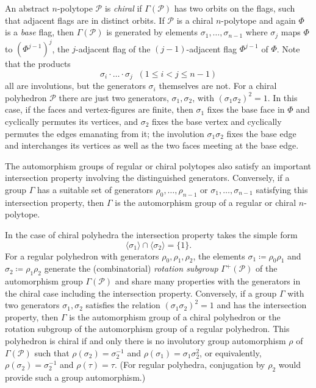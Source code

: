 \documentclass[12pt]{article}
\theoremstyle{definition}\newtheorem{definition}{Definition}[section]
\begin{document}
An abstract $n$-polytope $\mathcal{P}$ is {\em chiral\/} if $\Gamma(\mathcal{P})$ has two orbits on the flags, such that adjacent flags are in distinct orbits. If $\mathcal{P}$ is a chiral $n$-polytope and again $\Phi$ is a {\em base\/} flag, then $\Gamma(\mathcal{P})$ is generated by elements $\sigma_1,\ldots,\sigma_{n-1}$ where $\sigma_j$ maps $\Phi$ to $(\Phi^{j-1})^{j}$, the $j$-adjacent flag of the $(j-1)$-adjacent flag $\Phi^{j-1}$ of $\Phi$. Note that the products
\[\sigma_{i}\cdot\ldots\cdot\sigma_{j}\;\; (1\leq i<j\leq n-1)\]
all are involutions, but the generators $\sigma_i$ themselves are not. For a chiral polyhedron $\mathcal{P}$ there are just two generators, $\sigma_{1},\sigma_{2}$, with $(\sigma_1\sigma_2)^2=1$. In this case, if the faces and vertex-figures are finite, then $\sigma_1$ fixes the base face in $\Phi$ and cyclically permutes its vertices, and $\sigma_2$ fixes the base vertex and cyclically permutes the edges emanating from it; the involution $\sigma_1\sigma_2$ fixes the base edge and interchanges its vertices as well as the two faces meeting at the base edge.
\smallskip

The automorphism groups of regular or chiral polytopes also satisfy an important intersection property involving the distinguished generators. Conversely, if a group $\Gamma$ has a suitable set of generators $\rho_0,\ldots,\rho_{n-1}$ or $\sigma_1,\ldots,\sigma_{n-1}$ satisfying this intersection property, then $\Gamma$ is the automorphism group of a regular or chiral $n$-polytope. 

In the case of chiral polyhedra the intersection property takes the simple form 
\[\langle\sigma_1\rangle \cap \langle\sigma_2\rangle = \{1\}.\]
For a regular polyhedron with generators $\rho_0,\rho_1,\rho_2$, the elements $\sigma_1\coloneqq \rho_0\rho_1$ and $\sigma_2\coloneqq  \rho_1\rho_2$ generate the (combinatorial) {\it rotation subgroup\/} $\Gamma^+(\mathcal{P})$ of the automorphism group $\Gamma(\mathcal{P})$ and share many properties with the generators in the chiral case including the intersection property.
Conversely, if a group $\Gamma$ with two generators $\sigma_1,\sigma_{2}$ satisfies the relation $(\sigma_1\sigma_2)^2=1$ and has the intersection property, then $\Gamma$ is the automorphism group of a chiral polyhedron or the rotation subgroup of the automorphism group of a regular polyhedron. This polyhedron is chiral if and only there is no involutory group automorphism $\rho$ of $\Gamma(\mathcal{P})$ such that $\rho(\sigma_2)=\sigma_{2}^{-1}$ and $\rho(\sigma_1)=\sigma_{1}\sigma_2^2$, or equivalently, $\rho(\sigma_2)=\sigma_{2}^{-1}$ and $\rho(\tau)=\tau$. (For regular polyhedra, conjugation by $\rho_2$ would provide such a group automorphism.)  
\end{document}
